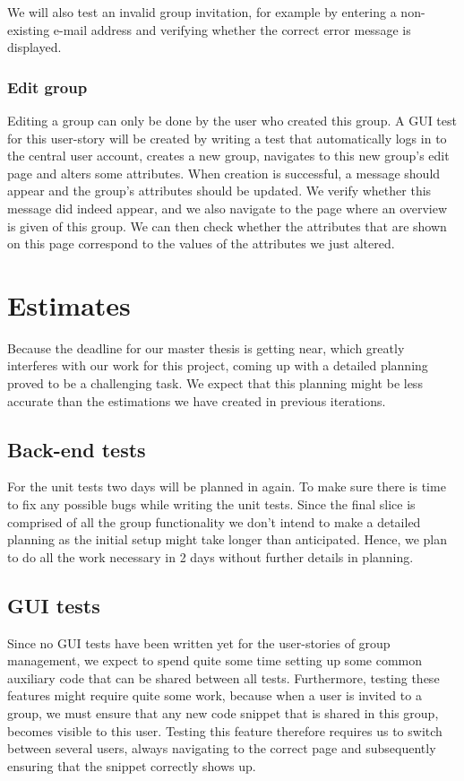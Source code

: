 \documentclass[10pt,a4paper,BCOR12mm, headexclude, footexclude,
  twoside, openright]{scrartcl}
\numberwithin{equation}{section} %
\numberwithin{figure}{section} %
\numberwithin{table}{section} %
\begin{document}
We will also test an invalid group invitation, for example by entering a non-existing e-mail address and verifying whether the correct error message is displayed.

\subsubsection*{Edit group}

Editing a group can only be done by the user who created this group.
A GUI test for this user-story will be created by writing a test that automatically logs in to the central user account, creates a new group, navigates to this new group's edit page and alters some attributes.
When creation is successful, a message should appear and the group's attributes should be updated.
We verify whether this message did indeed appear, and we also navigate to the page where an overview is given of this group.
We can then check whether the attributes that are shown on this page correspond to the values of the attributes we just altered.

\section{Estimates}
Because the deadline for our master thesis is getting near, which greatly interferes with our work for this project, coming up with a detailed planning proved to be a challenging task.
We expect that this planning might be less accurate than the estimations we have created in previous iterations.

\subsection{Back-end tests}
For the unit tests two days will be planned in again. To make sure there is time
to fix any possible bugs while writing the unit tests. Since the final slice is
comprised of all the group functionality we don't intend to make a detailed
planning as the initial setup might take longer than anticipated. Hence, we plan
to do all the work necessary in 2 days without further details in planning.

\subsection{GUI tests}
Since no GUI tests have been written yet for the user-stories of group management, we expect to spend quite some time setting up some common auxiliary code that can be shared between all tests.
Furthermore, testing these features might require quite some work, because when a user is invited to a group, we must ensure that any new code snippet that is shared in this group, becomes visible to this user.
Testing this feature therefore requires us to switch between several users, always navigating to the correct page and subsequently ensuring that the snippet correctly shows up.
\end{document}
